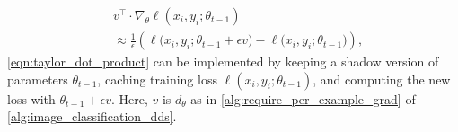 \begin{equation}
  \label{eqn:taylor_dot_product}
  \begin{aligned}
    & v^\top \cdot \nabla_\theta \ell(x_i, y_i; \theta_{t-1}) \\
    & \approx
    \frac{1}{\epsilon}
    \left(
      \ell\big( x_i, y_i; \theta_{t-1} + \epsilon v \big) -
      \ell\big( x_i, y_i; \theta_{t-1} \big)
    \right),
  \end{aligned}
\end{equation}
\autoref{eqn:taylor_dot_product} can be implemented by keeping a shadow version of parameters $\theta_{t-1}$, caching training loss $\ell(x_i, y_i; \theta_{t-1})$, and computing the new loss with $\theta_{t-1} + \epsilon v$. Here, $v$ is $d_\theta$ as in \autoref{alg:require_per_example_grad} of \autoref{alg:image_classification_dds}.
